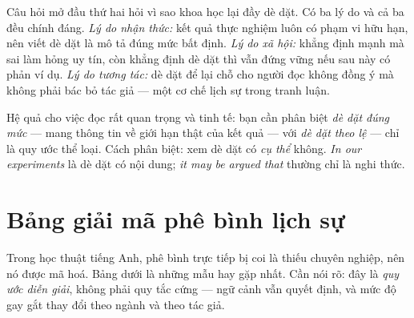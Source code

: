 \documentclass[../../english.tex]{subfiles}
\begin{document}
Câu hỏi mở đầu thứ hai hỏi vì sao khoa học lại đầy dè dặt. Có ba lý do và cả ba đều chính đáng. \emph{Lý do nhận thức:} kết quả thực nghiệm luôn có phạm vi hữu hạn, nên viết dè dặt là mô tả đúng mức bất định. \emph{Lý do xã hội:} khẳng định mạnh mà sai làm hỏng uy tín, còn khẳng định dè dặt thì vẫn đứng vững nếu sau này có phản ví dụ. \emph{Lý do tương tác:} dè dặt để lại chỗ cho người đọc không đồng ý mà không phải bác bỏ tác giả --- một cơ chế lịch sự trong tranh luận\cite{hyland1998}.

Hệ quả cho việc đọc rất quan trọng và tinh tế: bạn cần phân biệt \emph{dè dặt đúng mức} --- mang thông tin về giới hạn thật của kết quả --- với \emph{dè dặt theo lệ} --- chỉ là quy ước thể loại. Cách phân biệt: xem dè dặt có \emph{cụ thể} không. \emph{In our experiments} là dè dặt có nội dung; \emph{it may be argued that} thường chỉ là nghi thức.

\section{Bảng giải mã phê bình lịch sự}

Trong học thuật tiếng Anh, phê bình trực tiếp bị coi là thiếu chuyên nghiệp, nên nó được mã hoá. Bảng dưới là những mẫu hay gặp nhất. Cần nói rõ: đây là \emph{quy ước diễn giải}, không phải quy tắc cứng --- ngữ cảnh vẫn quyết định, và mức độ gay gắt thay đổi theo ngành và theo tác giả.
\end{document}
